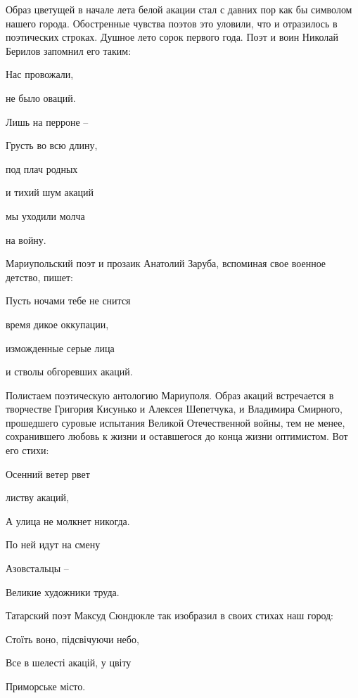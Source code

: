 Образ цветущей в начале лета белой акации стал с давних пор как бы символом
нашего города. Обостренные чувства поэтов это уловили, что и отразилось в
поэтических строках. Душное лето сорок первого года. Поэт и воин Николай
Берилов запомнил его таким:

\begin{qqquote}
Нас провожали,

не было оваций.

Лишь на перроне –

Грусть во всю длину,

под плач родных

и тихий шум акаций

мы уходили молча

на войну.
\end{qqquote}

Мариупольский поэт и прозаик Анатолий Заруба, вспоминая свое военное детство, пишет:

\begin{qqquote}
Пусть ночами тебе не снится

время дикое оккупации,

изможденные серые лица

и стволы обгоревших акаций.	
\end{qqquote}

Полистаем поэтическую антологию Мариуполя. Образ акаций встречается в
творчестве Григория Кисунько и Алексея Шепетчука, и Владимира Смирного,
прошедшего суровые испытания Великой Отечественной войны, тем не менее,
сохранившего любовь к жизни и оставшегося до конца жизни оптимистом. Вот его
стихи:

\begin{qqquote}
Осенний ветер рвет

листву акаций,

А улица не молкнет никогда.

По ней идут на смену

Азовстальцы –

Великие художники труда.	
\end{qqquote}

Татарский поэт Максуд Сюндюкле так изобразил в своих стихах наш город:

\begin{qqquote}
Стоїть воно, підсвічуючи небо,

Все в шелесті акацій, у цвіту

Приморське місто.	
\end{qqquote}

